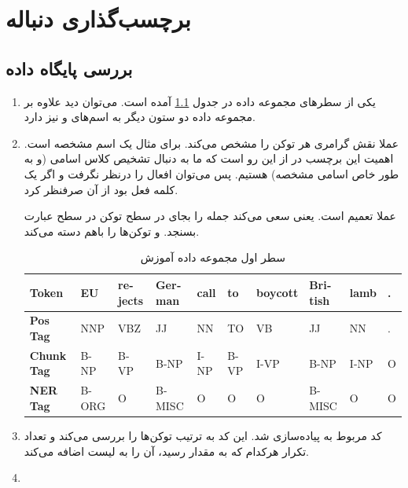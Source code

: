 
\def \Subject {برچسب‌گذاری دنباله}
\def \Session { یک}
\renewcommand{\chaptername}{سوال}
\chapter{\Subject}
\section{بررسی پایگاه داده}
\begin{enumerate}
\item 

یکی از سطرهای مجموعه داده 
در جدول 
\ref{tab:q1_datasample}
آمده است. می‌توان دید علاوه بر 
مجموعه داده دو ستون دیگر به اسم‌های 
و 
نیز دارد. 
\item 
{}
عملا نقش گرامری هر توکن را مشخص می‌کند. برای مثال
یک اسم مشخصه 
است. اهمیت این برچسب در 
از این رو است که ما به دنبال تشخیص کلاس اسامی (و به طور خاص اسامی مشخصه) هستیم. پس می‌توان افعال را درنظر نگرفت و اگر یک کلمه فعل بود از آن صرفنظر کرد. 

عملا تعمیم 
است. یعنی سعی می‌کند جمله را بجای در سطح توکن در سطح عبارت
بسنجد. و توکن‌ها را باهم دسته می‌کند. 

  \begin{table}[H]
	\centering
	\caption{سطر اول مجموعه داده آموزش}
	\label{tab:q1_datasample}
	\begin{latin}
\footnotesize

\begin{tabular}{llllllllll}
	\toprule
	\textbf{Token}  & EU & rejects & German & call & to & boycott & British & lamb & . \\
	\midrule
	\textbf{Pos Tag} & NNP & VBZ & JJ & NN & TO & VB & JJ & NN & . \\
	\textbf{Chunk Tag}& B-NP & B-VP & B-NP & I-NP & B-VP & I-VP & B-NP & I-NP & O \\
	\textbf{NER Tag} & B-ORG & O & B-MISC & O & O & O & B-MISC & O & O \\
	\bottomrule
\end{tabular}
	\end{latin}
	
	
\end{table}

\item 
کد مربوط به 
پیاده‌سازی شد. این کد به ترتیب توکن‌ها را بررسی می‌کند و تعداد تکرار هرکدام که به مقدار 
رسید، آن را به لیست 
اضافه می‌کند.
\item 
~\\



\end{enumerate}
